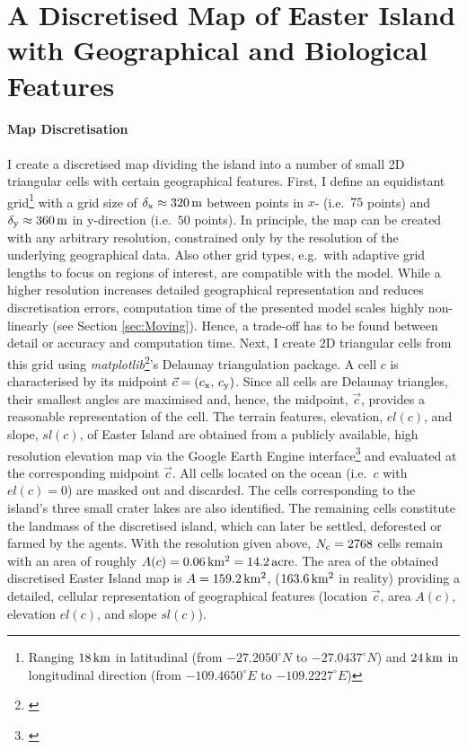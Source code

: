 \FloatBarrier
\section{A Discretised Map of Easter Island with Geographical and Biological Features}\label{sec:CreateMap}
\paragraph{Map Discretisation}
I create a discretised map dividing the island into a number of small 2D triangular cells with certain geographical features.
First, I define an equidistant grid\footnote{Ranging $18\, {\rm km}$ in latitudinal (from $-27.2050^\circ N$ to $-27.0437^\circ N$) and $24\, {\rm km}$ in longitudinal direction (from  $-109.4650^\circ E$ to 
 $-109.2227^\circ E$)} with a grid size of $\delta_{\rm x} \approx 320\, {\rm m}$ between points in $x$- (i.e.\ $75$ points) and $\delta_{\rm y} \approx 360\, {\rm m}$ in y-direction (i.e.\ $50$ points). 
In principle, the map can be created with any arbitrary resolution, constrained only by the resolution of the underlying geographical data. 
Also other grid types, e.g.\ with adaptive grid lengths to focus on regions of interest, are compatible with the model. 
While a higher resolution increases detailed geographical representation and reduces discretisation errors, computation time of the presented model scales highly non-linearly (see Section \ref{sec:Moving}).
Hence, a trade-off has to be found between detail or accuracy and computation time.
Next, I create 2D triangular cells from this grid using \textit{matplotlib}\footnote{\citet{matplotlib}}'s Delaunay triangulation package.
A cell $c$ is characterised by its midpoint $\vec{c} = (c_{\rm x},\, c_{\rm y})$. 
Since all cells are Delaunay triangles, their smallest angles are maximised and, hence, the midpoint, $\vec{c}$, provides a reasonable representation of the cell.
The terrain features, elevation, $el(c)$, and slope, $sl(c)$, of Easter Island are obtained from a publicly available, high resolution elevation map \citep{Jarvis2008CIGAR} via the Google Earth Engine interface\footnote{\citep{gorelick2017google}} and evaluated at the corresponding midpoint $\vec{c}$.
All cells located on the ocean (i.e.\ $c$ with $el(c)=0$) are masked out and discarded.
The cells corresponding to the island's three small crater lakes are also identified.
The remaining cells constitute the landmass of the discretised island, which can later be settled, deforested or farmed by the agents. 
With the resolution given above, $N_{\rm c} = 2768$ cells remain with an area of roughly $A(c)= 0.06 \, {\rm km^2} = 14.2 \, {\rm acre}$.
The area of the obtained discretised Easter Island map is $A=159.2\, {\rm km^2}$, ($163.6\, {\rm km^2}$ in reality) providing a detailed, cellular representation of geographical features (location $\vec{c}$, area $A(c)$, elevation $el(c)$, and slope $sl(c)$).

